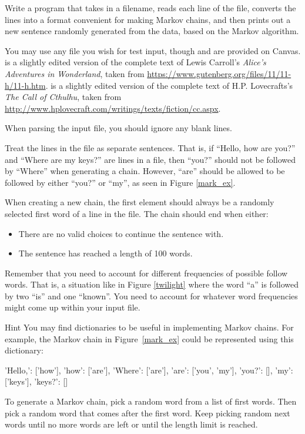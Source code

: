 \documentclass[11pt]{cselabheader}
\begin{document}
\begin{ex}[markov.py]
  Write a program that takes in a filename, reads each line of the file,
  converts the lines into a format convenient for making Markov chains, and
  then prints out a new sentence randomly generated from the data, based on
  the Markov algorithm. 

  You may use any file you wish for test input, though 
  and  are provided on Canvas.
   is a slightly edited version of the complete text of
  Lewis Carroll's \emph{Alice's Adventures in Wonderland}, taken from
  \url{https://www.gutenberg.org/files/11/11-h/11-h.htm}.
   is a slightly edited version of the complete text of
  H.P. Lovecrafts's \emph{The Call of Cthulhu}, taken from
  \url{http://www.hplovecraft.com/writings/texts/fiction/cc.aspx}.

  When parsing the input file, you should ignore any blank lines.
 
  Treat the lines in the file as separate
  sentences. That is, if ``Hello, how are you?'' and ``Where are my keys?''
  are lines in a file, then ``you?'' should not be followed by ``Where'' when
  generating a chain. However, ``are'' should be allowed to be followed by
  either ``you?'' or ``my'', as seen in Figure \ref{mark_ex}.

  When creating a new chain, the first element should always be a randomly
  selected first word of a line in the file. The chain should end when either:
  \begin{itemize}
  \item There are no valid choices to continue the sentence with.
  \item The sentence has reached a length of 100 words.
  \end{itemize}

  Remember that you need to account for different frequencies of possible
  follow words. That is, a situation like in Figure \ref{twilight} where
  the word ``a'' is followed by two ``is'' and one ``known''. You need to
  account for whatever word frequencies might come up within your input file.
\end{ex}

\begin{infobox}{Hint}
  You may find dictionaries to be useful in implementing
  Markov chains. For example, the Markov chain in Figure~\ref{mark_ex}
  could be represented using this dictionary:
\begin{python3code}
{'Hello,': ['how'], 'how': ['are'],
 'Where': ['are'], 'are': ['you', 'my'],
 'you?': [], 'my': ['keys'], 'keys?': []}
\end{python3code}
  To generate a Markov chain, pick a random word from a list of first
  words. Then pick a random word that comes after the first word.
  Keep picking random next words until no more words are left or until the
  length limit is reached.
\end{infobox}
\end{document}
